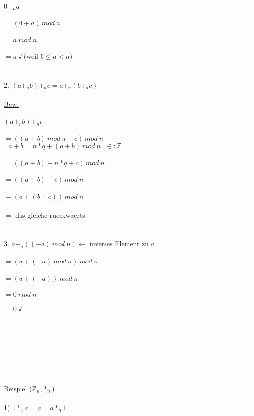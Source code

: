 \documentclass[18pt,a4paper]{article}
\newcommand{\tab}{\hspace*{2em}}
\begin{document}
\\
$0 +_n a$\\
\\
$= (0+a)\: mod\: a$\\
\\
$= a\: mod\: n$\\
\\
$= a\:\checkmark$\tab (weil $0\leqslant a<n$)\\
\\
\\
\uline{2.} $(a +_n b) +_n c = a +_n (b +_n c)$\\
\\
\uline{Bew.}\\
\\
$(a +_n b) +_n c$\\
\\
$= ((a+b)\: mod\: n + c)\: mod\: n$\\
$[a+b = n*q + (a+b) \: mod\: n] \in:\mathbb{Z}$\\
\\
$= ((a+b) - n*q +c)\: mod\: n$\\
\\
$= ((a+b)+c)\: mod\: n$\\
\\
$= (a+(b+c))\: mod\: n$\\
\\
$=$ das gleiche rueckwaerts\\
\\
\\
\uline{3.} $a +_n ((-a)\: mod\: n)$\tab $\leftarrow$ inverses Element zu $a$\\
\\
$= (a+(-a) \: mod\: n)\: mod\: n$\\
\\
$=(a+ (-a))\: mod\: n$\\
\\
$= 0\: mod\: n$\\
\\
$= 0\: \checkmark$\\
\\
\\
\rule{\textwidth}{0.4mm}\\
\\
\\
\\
\uline{Beispiel} ($\mathbb{Z}_n, *_n$)\\
\\
1) $1 *_n a = a = a *_n 1$\\
\\
\end{document}
